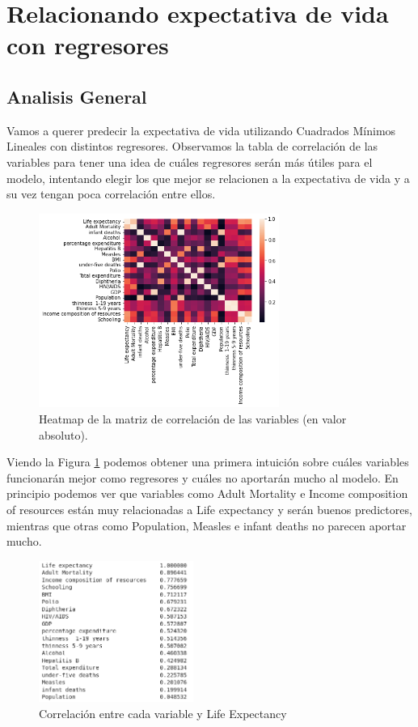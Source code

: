 \section{Relacionando expectativa de vida con regresores}

\subsection{Analisis General}
Vamos a querer predecir la expectativa de vida utilizando Cuadrados Mínimos Lineales con distintos regresores. Observamos la tabla de correlación de las variables para tener una idea de cuáles regresores serán más útiles para el modelo, intentando elegir los que mejor se relacionen a la expectativa de vida y a su vez tengan poca correlación entre ellos.


 \begin{figure}[H]
	\centering
	\includegraphics[width=0.7\textwidth]{img/heatmap_corr.png}
	\caption{Heatmap de la matriz de correlación de las variables (en valor absoluto).}
	\label{heatmap}
\end{figure}
        
Viendo la Figura \ref{heatmap} podemos  obtener una primera intuición sobre cuáles variables funcionarán mejor como regresores y cuáles no aportarán mucho al modelo. En principio podemos ver que variables como Adult Mortality e Income composition of resources están muy relacionadas a Life expectancy y serán buenos predictores, mientras que otras como Population, Measles e infant deaths no parecen aportar mucho.
 \begin{figure}[H]
	\centering
	\includegraphics[width=0.45\textwidth]{img/life_exp.png}
	\caption{Correlación entre cada variable y Life Expectancy}
	\label{corr}
\end{figure}

